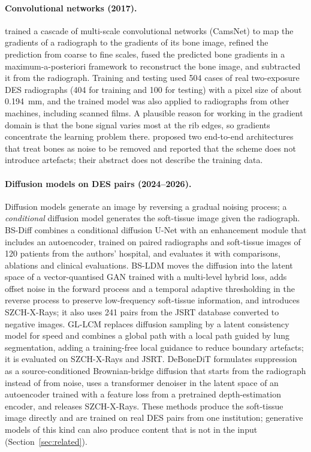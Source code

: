 \paragraph{Convolutional networks (2017).} \citet{yang2017cascade} trained a cascade of multi-scale convolutional networks (CamsNet) to map
the gradients of a radiograph to the gradients of its bone image, refined the prediction from coarse to fine scales, fused the predicted bone
gradients in a maximum-a-posteriori framework to reconstruct the bone image, and subtracted it from the radiograph. Training and testing used 504
cases of real two-exposure DES radiographs (404 for training and 100 for testing) with a pixel size of about 0.194~mm, and the trained model was
also applied to radiographs from other machines, including scanned films. A plausible reason for working in the gradient domain is that the bone
signal varies most at the rib edges, so gradients concentrate the learning problem there. \citet{gusarev2017deep} proposed two end-to-end architectures that treat bones as noise to be
removed and reported that the scheme does not introduce artefacts; their abstract does not describe the training data.

\paragraph{Diffusion models on DES pairs (2024--2026).} Diffusion models generate an image by reversing a gradual noising process; a
\emph{conditional} diffusion model generates the soft-tissue image given the radiograph. BS-Diff \citep{chen2024bsdiff} combines a conditional
diffusion U-Net with an enhancement module that includes an autoencoder, trained on paired radiographs and soft-tissue images of 120 patients
from the authors' hospital, and evaluates it with comparisons, ablations and clinical evaluations. BS-LDM \citep{sun2026bsldm} moves the diffusion
into the latent space of a vector-quantised GAN trained with a multi-level hybrid loss, adds offset noise in the forward process and a temporal
adaptive thresholding in the reverse process to preserve low-frequency soft-tissue information, and introduces SZCH-X-Rays; it also uses 241
pairs from the JSRT database \citep{shiraishi2000jsrt} converted to negative images. GL-LCM \citep{sun2025gllcm} replaces diffusion sampling by a
latent consistency model for speed and combines a global path with a local path guided by lung segmentation, adding a training-free local
guidance to reduce boundary artefacts; it is evaluated on SZCH-X-Rays and JSRT. DeBoneDiT \citep{sun2026debonedit} formulates suppression as a
source-conditioned Brownian-bridge diffusion that starts from the radiograph instead of from noise, uses a transformer denoiser in the latent
space of an autoencoder trained with a feature loss from a pretrained depth-estimation encoder, and releases SZCH-X-Rays. These methods produce
the soft-tissue image directly and are trained on real DES pairs from one institution; generative models of this kind can also produce content
that is not in the input (Section~\ref{sec:related}).

